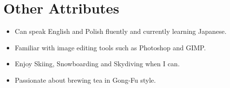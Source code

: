 \section*{Other Attributes}

\begin{itemize}
  \item Can speak English and Polish fluently and currently learning Japanese.
  \item Familiar with image editing tools such as Photoshop and GIMP.
  \item Enjoy Skiing, Snowboarding and Skydiving when I can.
  \item Passionate about brewing tea in Gong-Fu style.
\end{itemize}
